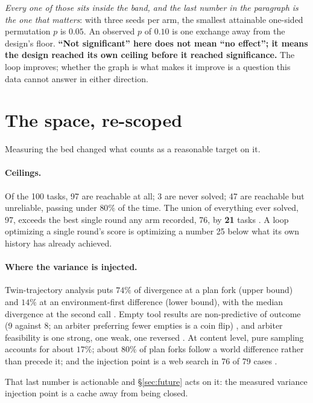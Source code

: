 \emph{Every one of those sits inside the band, and the last number in the
paragraph is the one that matters}: with three seeds per arm, the smallest
attainable one-sided permutation $p$ is $0.05$. An observed $p$ of $0.10$
is one exchange away from the design's floor. \textbf{``Not significant''
here does not mean ``no effect''; it means the design reached its own
ceiling before it reached significance.} The loop improves; whether the
graph is what makes it improve is a question this data cannot answer in
either direction.

\section{The space, re-scoped}
\label{sec:respace}

Measuring the bed changed what counts as a reasonable target on it.

\paragraph{Ceilings.} Of the 100 tasks, 97 are reachable at all; 3 are
never solved; 47 are reachable but unreliable, passing under $80\%$ of the
time. The union of everything ever solved, 97, exceeds the best single
round any arm recorded, 76, by \textbf{21} tasks . A loop optimizing a single round's score is optimizing a
number 25 below what its own history has already achieved.

\paragraph{Where the variance is injected.} Twin-trajectory analysis puts
$74\%$ of divergence at a plan fork (upper bound) and $14\%$ at an
environment-first difference (lower bound), with the median divergence at
the second call . Empty tool results are non-predictive of outcome
(9 against 8; an arbiter preferring fewer empties is a coin flip) ,
and arbiter feasibility is one strong, one weak, one reversed . At
content level, pure sampling accounts for about $17\%$; about $80\%$ of
plan forks follow a world difference rather than precede it; and the
injection point is a web search in 76 of 79 cases .

That last number is actionable and \S\ref{sec:future} acts on it: the
measured variance injection point is a cache away from being closed.

